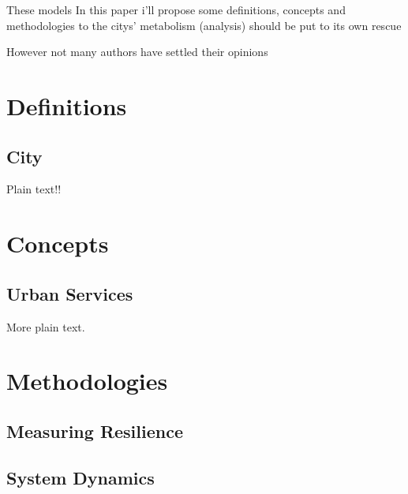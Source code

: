\documentclass[twocolumn, 10pt, a4paper]{article}
\begin{document}
These models 
In this paper i'll propose some definitions, concepts and methodologies to 
 the citys' metabolism (analysis) should be put to its own rescue 



However not many authors have settled their opinions  



\section{Definitions}


\subsection{City}


Plain text!!


	


\section{Concepts}

\subsection{Urban Services}

More plain text. 

\section{Methodologies}


\subsection{Measuring Resilience}

\subsection{System Dynamics}






\end{document}
